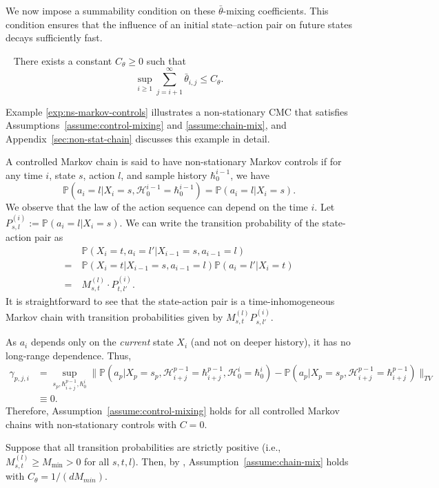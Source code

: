 \documentclass[twoside,11pt]{article}
\numberwithin{equation}{section}
\newcommand{\lp}{\left(}
\newcommand{\rp}{\right)}
\newcommand{\History}{\mathcal{H}}
\newcommand{\history}{\hbar}
\newcommand{\Pbb}{\mathbb{P}}
\newcommand{\prob}{\Pbb}
\newcommand{\probl}{\prob}
\begin{document}
We now impose a summability condition on these $\bar \theta$-mixing coefficients.
This condition ensures that the influence of an initial state–action pair on future states decays sufficiently fast.
\begin{assumption}~\label{assume:chain-mix} There exists a constant $C_{\theta}\geq 0$ such that
\[
\sup_{i \geq 1}\sum_{j=i+1}^{{ \infty}} \bar \theta_{i,j}\leq C_{\theta}. 
\]
\end{assumption}

Example \ref{exp:ns-markov-controls} illustrates a non-stationary CMC that satisfies Assumptions~\ref{assume:control-mixing} and \ref{assume:chain-mix}, and Appendix~\ref{sec:non-stat-chain} discusses this example in detail.
\begin{example}
\label{exp:ns-markov-controls}
A controlled Markov chain is said to have non-stationary Markov controls if for any time $i$, state $s$, action $l$, and sample history $\history_0^{i-1}$, we have
\[
\probl\lp a_i=l|X_i=s,\History_0^{i-1}=\history_0^{i-1}\rp=\probl\lp a_i=l|X_i =s\rp.
\]
We observe that the law of the action sequence can depend on the time $i$. 
Let $P_{s,l}^{(i)} := \prob(a_i=l|X_i=s)$.
We can write the transition probability of the state-action pair as
\begin{align*}
&\prob\lp X_i=t,a_i=l'|X_{i-1}=s,a_{i-1}=l\rp\\
= \ &\prob\lp X_i=t|X_{i-1}=s,a_{i-1}=l\rp\prob(a_i=l'|X_i=t)\\
= \ & M_{s,t}^{(l)}\cdot P_{t,l'}^{(i)}.
\end{align*}
It is straightforward to see that the state-action pair is a time-inhomogeneous Markov chain with transition probabilities given by $M_{s,t}^{(l)} P_{s,l'}^{(i)}$. 

As $a_i$ depends only on the \emph{current} state $X_i$ (and not on deeper history), it has no long-range dependence. Thus,
    \begin{align*}
\gamma_{p,j,i} & = 
    \sup_{s_p, \history_{i+j}^{p-1}, \history_0^i} 
    \Big\lVert 
        \probl\lp 
            a_p \Big| X_p = s_p, \History_{i+j}^{p-1} = \history_{i+j}^{p-1}, \History_0^i = \history_{0}^i
        \rp - 
        \probl\lp  
            a_p \Big| X_p = s_p, \History_{i+j}^{p-1} = \history_{i+j}^{p-1}
        \rp
    \Big\rVert_{TV} \\
    & \equiv 0.
\end{align*}
Therefore, Assumption~\ref{assume:control-mixing} holds for all controlled Markov chains with non-stationary controls with $C=0$.

Suppose that all transition probabilities are strictly positive (i.e., $M^{(l)}_{s,t} \ge M_{\min} > 0$ for all $s,t,l$). 
Then, by \citet[Lemma 12]{banerjee2025off}, Assumption~\ref{assume:chain-mix} holds with $C_\theta = 1/(d M_{min})$.
\end{example}
\end{document}
